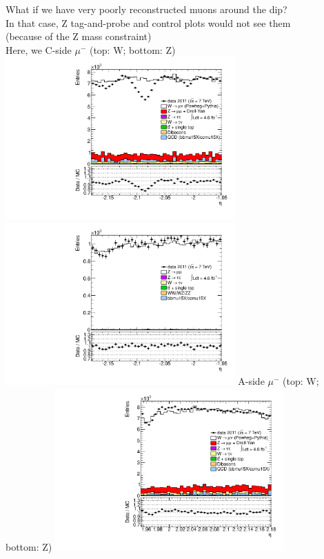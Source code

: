 {
What if we have very poorly reconstructed muons around the dip? \\
In that case, Z tag-and-probe and control plots would not see them \\
(because of the Z mass constraint) \\
Here, we 
}
 {
\colb[T]
C-side $\mu^{-}$ (top: W; bottom: Z)
\centering
\includegraphics[width=0.66\textwidth]{dates/20130306/figures/both/W_10_C_stack_l_eta_NEG} \\
\includegraphics[width=0.66\textwidth]{dates/20130306/figures/both/Znowind_10_C_stack_lN_eta_ALL.pdf}
A-side $\mu^{-}$ (top: W; bottom: Z)
\centering
\includegraphics[width=0.66\textwidth]{dates/20130306/figures/both/W_10_A_stack_l_eta_NEG} \\
}
